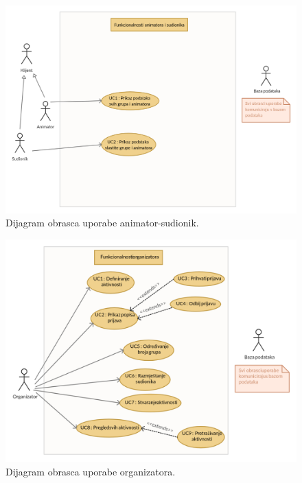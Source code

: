 \begin{figure}[H]
	\includegraphics[scale=0.26]{dijagrami/Animator i sudionik.jpg} %
	\centering
	\caption{Dijagram obrasca uporabe animator-sudionik.}
	\label{fig:promjene}
\end{figure}

\pagebreak

\begin{figure}[H]
	\includegraphics[scale=0.26]{dijagrami/Organizator.jpg} %
	\centering
	\caption{Dijagram obrasca uporabe organizatora.}
	\label{fig:promjene}
\end{figure}


